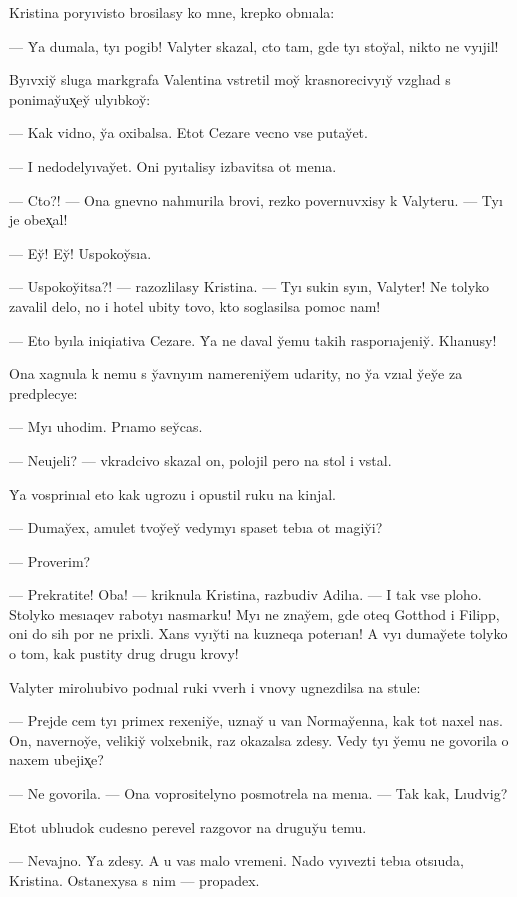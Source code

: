 \documentclass[10pt]{book}
\begin{document}
Kristina poryıvisto brosilasy ko mne, krepko obnıala:

— Y̆a dumala, tyı pogib! Valyter skazal, cto tam, gde tyı stoy̆al, nikto ne vyıjil!

Byıvxiy̆ sluga markgrafa Valentina vstretil moy̆ krasnorecivyıy̆ vzglıad s ponimay̆ux̨ey̆ ulyıbkoy̆:

— Kak vidno, y̆a oxibalsa. Etot Cezare vecno vse putay̆et.

— I nedodelyıvay̆et. Oni pyıtalisy izbavitsa ot menıa.

— Cto?! — Ona gnevno nahmurila brovi, rezko povernuvxisy k Valyteru. — Tyı je obex̨al!

— Ey̆! Ey̆! Uspokoy̆sıa.

— Uspokoy̆itsa?! — razozlilasy Kristina. — Tyı sukin syın, Valyter! Ne tolyko zavalil delo, no i hotel ubity tovo, kto soglasilsa pomoc nam!

— Eto byıla iniqiativa Cezare. Y̆a ne daval y̆emu takih rasporıajeniy̆. Klıanusy!

Ona xagnula k nemu s y̆avnyım namereniy̆em udarity, no y̆a vzıal y̆ey̆e za predplecye:

— Myı uhodim. Prıamo sey̆cas.

— Neujeli? — vkradcivo skazal on, polojil pero na stol i vstal.

Y̆a vosprinıal eto kak ugrozu i opustil ruku na kinjal.

— Dumay̆ex, amulet tvoy̆ey̆ vedymyı spaset tebıa ot magiy̆i?

— Proverim?

— Prekratite! Oba! — kriknula Kristina, razbudiv Adilıa. — I tak vse ploho. Stolyko mesıaqev rabotyı nasmarku! Myı ne znay̆em, gde oteq Gotthod i Filipp, oni do sih por ne prixli. Xans vyıy̆ti na kuzneqa poterıan! A vyı dumay̆ete tolyko o tom, kak pustity drug drugu krovy!

Valyter mirolıubivo podnıal ruki vverh i vnovy ugnezdilsa na stule:

— Prejde cem tyı primex rexeniy̆e, uznay̆ u van Normay̆enna, kak tot naxel nas. On, navernoy̆e, velikiy̆ volxebnik, raz okazalsa zdesy. Vedy tyı y̆emu ne govorila o naxem ubejix̨e?

— Ne govorila. — Ona voprositelyno posmotrela na menıa. — Tak kak, Lıudvig?

Etot ublıudok cudesno perevel razgovor na druguy̆u temu.

— Nevajno. Y̆a zdesy. A u vas malo vremeni. Nado vyıvezti tebıa otsıuda, Kristina. Ostanexysa s nim — propadex.
\end{document}
